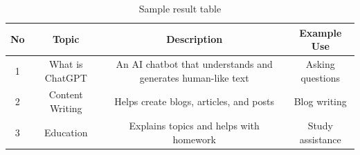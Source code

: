 \documentclass[12pt]{report}
\begin{document}
\begin{table}[]
    \centering
    \caption{Sample result table}
    \label{tab : result}
    \begin{tabular}{|c|c|c|c|}
    \hline
    \textbf{No} & \textbf{Topic} & \textbf{Description} & \textbf{Example Use}\\
    \hline
    1 & What is ChatGPT & An AI chatbot that understands and generates human-like text & Asking questions \\
    \hline
    2 &Content Writing & Helps create blogs, articles, and posts & Blog writing \\
    \hline
    3 & Education & Explains topics and helps with homework & Study assistance\\
    \hline
    \end{tabular}
    \end{table}
\end{document}
